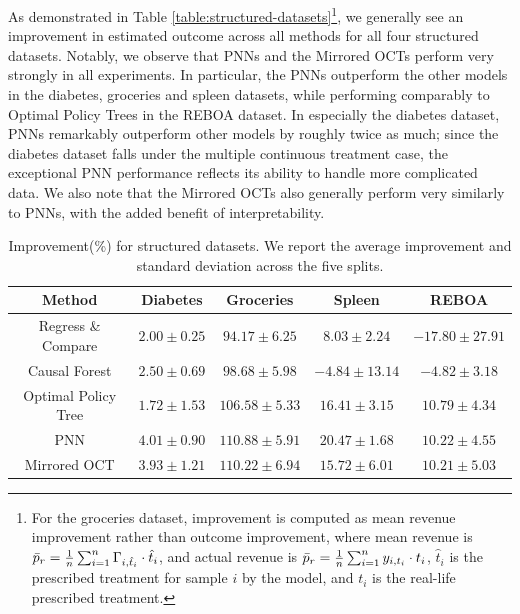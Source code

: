 \documentclass[10pt]{article} %
\begin{document}
As demonstrated in Table \ref{table:structured-datasets}\footnote{For the groceries dataset, improvement is computed as mean revenue improvement rather than outcome improvement, where mean revenue is $\Bar{p}_r = \frac{1}{n} \sum_{i=1}^{n} \Gamma_{i,\hat{t}_{i}} \cdot \hat{t}_{i}$, and actual revenue is  $\Bar{p}_r = \frac{1}{n} \sum_{i=1}^{n} y_{i,t_{i}} \cdot t_{i}$, $\hat{t}_i$ is the prescribed treatment for sample $i$ by the model, and $t_{i}$ is the real-life prescribed treatment.}, we generally see an improvement in estimated outcome across all methods for all four structured datasets. Notably, we observe that PNNs and the Mirrored OCTs perform very strongly in all experiments. In particular, the PNNs outperform the other models in the diabetes, groceries and spleen datasets, while performing comparably to Optimal Policy Trees in the REBOA dataset. In especially the diabetes dataset, PNNs remarkably outperform other models by roughly twice as much; since the diabetes dataset falls under the multiple continuous treatment case, the exceptional PNN performance reflects its ability to handle more complicated data. We also note that the Mirrored OCTs also generally perform very similarly to PNNs, with the added benefit of interpretability. 

\begin{table}[ht]\caption{Improvement(\%) for structured datasets. We report the average improvement and standard deviation across the five splits.}\label{table:structured-results}
\begin{center}
\begin{tabular}{ccccc}
\textbf{Method} & \textbf{Diabetes} & \textbf{Groceries} & \textbf{Spleen} & \textbf{REBOA} \\ \midrule
Regress \& Compare & $2.00\pm 0.25$ & $94.17 \pm 6.25$ & $8.03 \pm 2.24$ & $-17.80 \pm 27.91$ \\ 
Causal Forest & $ 2.50 \pm 0.69$& $98.68 \pm 5.98$ & $-4.84 \pm 13.14$& $-4.82 \pm 3.18$\\ 
Optimal Policy Tree & $1.72\pm 1.53$ & $106.58 \pm 5.33$ & $16.41 \pm 3.15$ & $\mathbf{10.79 \pm 4.34}$\\ 
PNN & $\mathbf{4.01 \pm 0.90} $& $\mathbf{110.88 \pm 5.91}$ & $\mathbf{20.47 \pm 1.68}$& $10.22 \pm 4.55$\\ 
Mirrored OCT & $3.93\pm 1.21$ & $110.22\pm 6.94$ & $15.72\pm 6.01$ &$10.21\pm 5.03$ \\ 
\end{tabular}
\end{center}
\end{table}
\end{document}
